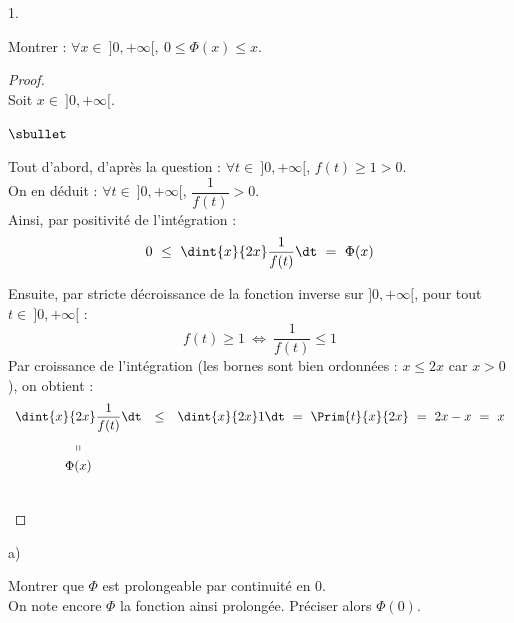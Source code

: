 \documentclass[11pt]{article}%
\begin{document}
\begin{noliste}{1.}
  
  \item Montrer : $\forall x \in \ ]0,+\infty[, \ 0 \leq \Phi(x) \leq 
  x$.
  
  \begin{proof}~\\
    Soit $x\in \ ]0,+\infty[$.
    \begin{noliste}{$\sbullet$}
      \item Tout d'abord, d'après la question  :
      $\forall t \in \ ]0,+\infty[$, $f(t) \geq 1 > 0$.\\[.1cm]
      On en déduit : $\forall t \in \ ]0,+\infty[$, $\dfrac{1}{f(t)}
      > 0$.\\[.1cm]
      Ainsi, par positivité de l'intégration :
      \[
        \begin{array}{ccc}
           0 \ \leq \ \dint{x}{2x} \dfrac{1}{f(t)} \dt \ = \
           \Phi(x)
        \end{array}
      \]
      
      \item Ensuite, par stricte décroissance de la fonction inverse
      sur $]0,+\infty[$, pour tout $t \in \ ]0,+\infty[$ :
      \[
        f(t) \geq 1 \ \Leftrightarrow \ \dfrac{1}{f(t)} \leq 1
      \]
      Par croissance de l'intégration (les bornes sont bien ordonnées 
      : $x \leq 2x$ car $x>0$), on obtient :
      \[
        \begin{array}{ccc}
          \dint{x}{2x} \dfrac{1}{f(t)} \dt & \leq & \dint{x}{2x} 1 \dt
          \ = \ \Prim{t}{x}{2x} \ = \ 2x-x \ = \ x
          \\[.4cm]
          \shortparallel
          \\[.1cm]
          \Phi(x)
        \end{array}
      \]
    \end{noliste}
    \conc{Finalement : $\forall x \in \ ]0,+\infty[$, $0 \leq 
    \Phi(x) \leq x$.}
    
    
    
    
    ~\\[-1.4cm]
  \end{proof}
  
  \item 
  \begin{noliste}{a)}
    \setlength{\itemsep}{2mm}
    \item Montrer que $\Phi$ est prolongeable par continuité en $0$.\\
    On note encore $\Phi$ la fonction ainsi prolongée. Préciser alors 
    $\Phi(0)$.
    

\end{noliste}
\end{noliste}
\end{document}
